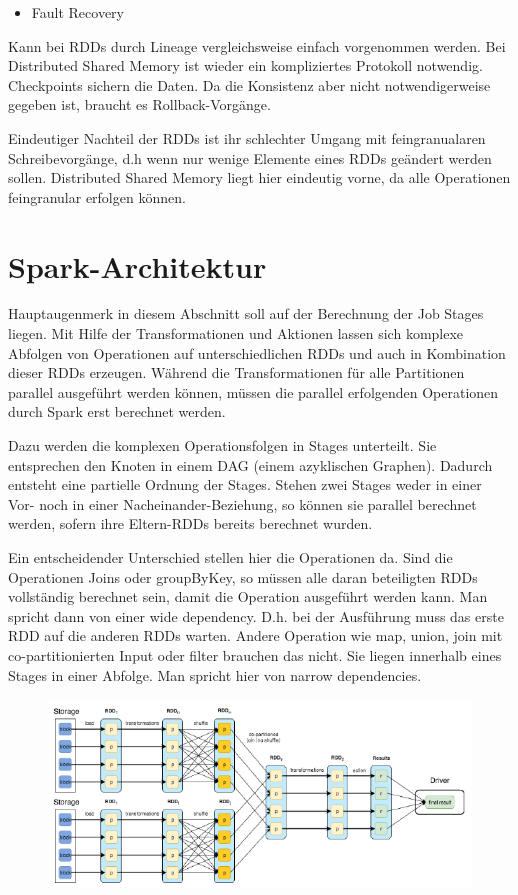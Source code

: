 \begin{itemize}
\item Fault Recovery
\end{itemize}
Kann bei RDDs durch Lineage vergleichsweise einfach vorgenommen werden.
Bei Distributed Shared Memory ist wieder ein kompliziertes Protokoll
notwendig. Checkpoints sichern die Daten. Da die Konsistenz aber nicht
notwendigerweise gegeben ist, braucht es Rollback-Vorgänge. 

Eindeutiger Nachteil der RDDs ist ihr schlechter Umgang mit
feingranualaren Schreibevorgänge, d.h wenn nur wenige Elemente eines
RDDs geändert werden sollen. Distributed Shared Memory liegt hier
eindeutig vorne, da alle Operationen feingranular erfolgen können.

\section[Spark{}-Architektur]{\rmfamily
Spark-Architektur}
Hauptaugenmerk in diesem Abschnitt soll auf der Berechnung der Job
Stages liegen. Mit Hilfe der Transformationen und Aktionen lassen sich
komplexe Abfolgen von Operationen auf unterschiedlichen RDDs und auch
in Kombination dieser RDDs erzeugen. Während die Transformationen für
alle Partitionen parallel ausgeführt werden können, müssen die parallel
erfolgenden Operationen durch Spark erst berechnet werden.

Dazu werden die komplexen Operationsfolgen in Stages unterteilt. Sie
entsprechen den Knoten in einem DAG (einem azyklischen Graphen).
Dadurch entsteht eine partielle Ordnung der Stages. Stehen zwei Stages
weder in einer Vor- noch in einer Nacheinander-Beziehung, so können sie
parallel berechnet werden, sofern ihre Eltern-RDDs bereits berechnet
wurden. 

Ein entscheidender Unterschied stellen hier die Operationen da. Sind die
Operationen Joins oder groupByKey, so müssen alle daran beteiligten
RDDs vollständig berechnet sein, damit die Operation ausgeführt werden
kann. Man spricht dann von einer wide dependency. D.h. bei der
Ausführung muss das erste RDD auf die anderen RDDs warten. Andere
Operation wie map, union, join mit co-partitionierten Input oder filter
brauchen das nicht. Sie liegen innerhalb eines Stages in einer Abfolge.
Man spricht hier von narrow dependencies.

\begin{figure}
\centering
\includegraphics[width=\textwidth]{bilder/Seminartext-img2.png}
\end{figure}

